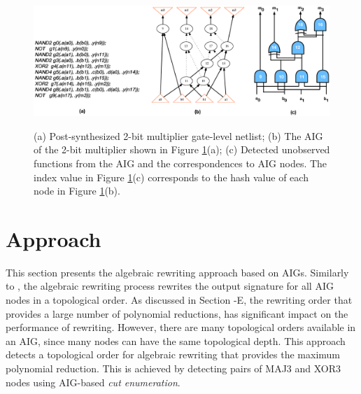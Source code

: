 \begin{figure}[t] 
\begin{center}
\includegraphics[scale=0.30]{../figs/aig-to-gatenetlist.eps}
\caption{(a) Post-synthesized 2-bit multiplier gate-level netlist; (b) The AIG of the 2-bit multiplier shown in Figure \ref{fig:2-bit-mult-aig}(a); (c) Detected unobserved functions from the AIG and the correspondences to AIG nodes. The index value in Figure \ref{fig:2-bit-mult-aig}(c) corresponds to the hash value of each node in Figure \ref{fig:2-bit-mult-aig}(b). }
\vspace{-3mm}
\label{fig:2-bit-mult-aig}
\end{center}
\end{figure}

\section{Approach} \label{sec:approach}

This section presents the algebraic rewriting approach based on AIGs. Similarly to \cite{ciesielski2015verification}, the algebraic rewriting process rewrites the output signature for all AIG nodes in a topological order. As discussed in Section -E, the rewriting order that provides a large number of polynomial reductions, has significant impact on the performance of rewriting. However, there are many topological orders available in an AIG, since many nodes can have the same topological depth. This approach detects a topological order for algebraic rewriting that provides the maximum polynomial reduction. This is achieved by detecting pairs of MAJ3 and XOR3 nodes using AIG-based \textit{cut enumeration}. 

